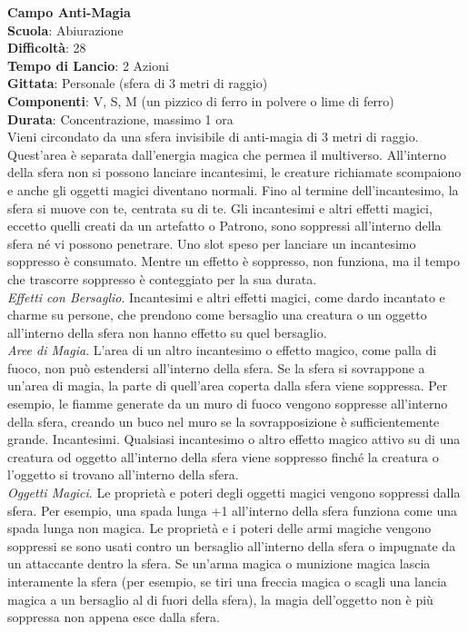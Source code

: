 \begin{multicols}{2}
\medskip\textbf{Campo Anti-Magia}\\
\textbf{Scuola}: Abiurazione\\
\textbf{Difficoltà}: 28\\
\textbf{Tempo di Lancio}: 2 Azioni\\
\textbf{Gittata}: Personale (sfera di 3 metri di raggio)\\
\textbf{Componenti}: V, S, M (un pizzico di ferro in polvere o lime di ferro)\\
\textbf{Durata}: Concentrazione, massimo 1 ora\\
Vieni circondato da una sfera invisibile di anti-magia di 3 metri di raggio. Quest'area è separata dall'energia magica che permea il multiverso. All'interno della sfera non si possono lanciare incantesimi, le creature richiamate scompaiono e anche gli oggetti magici diventano normali. Fino al termine dell'incantesimo, la sfera si muove con te, centrata su di te. Gli incantesimi e altri effetti magici, eccetto quelli creati da un artefatto o Patrono, sono soppressi all'interno della sfera né vi possono penetrare. Uno slot speso per lanciare un incantesimo soppresso è consumato. Mentre un effetto è soppresso, non funziona, ma il tempo che trascorre soppresso è conteggiato per la sua durata. 
\\\textit{Effetti con Bersaglio}. Incantesimi e altri effetti magici, come dardo incantato e charme su persone, che prendono come bersaglio una creatura o un oggetto all'interno della sfera non hanno effetto su quel bersaglio.
\\\textit{Aree di Magia}. L'area di un altro incantesimo o effetto magico, come palla di fuoco, non può estendersi all'interno della sfera. Se la sfera si sovrappone a un'area di magia, la parte di quell'area coperta dalla sfera viene soppressa. Per esempio, le fiamme generate da un muro di fuoco vengono soppresse all'interno della sfera, creando un buco nel muro se la sovrapposizione è sufficientemente grande. Incantesimi. Qualsiasi incantesimo o altro effetto magico attivo su di una creatura od oggetto all'interno della sfera viene soppresso finché la creatura o l'oggetto si trovano all'interno della sfera.\\
\textit{Oggetti Magici}. Le proprietà e poteri degli oggetti magici vengono soppressi dalla sfera. Per esempio, una spada lunga +1 all'interno della sfera funziona come una spada lunga non magica. Le proprietà e i poteri delle armi magiche vengono soppressi se sono usati contro un bersaglio all'interno della sfera o impugnate da un attaccante dentro la sfera. Se un'arma magica o munizione magica lascia interamente la sfera (per esempio, se tiri una freccia magica o scagli una lancia magica a un bersaglio al di fuori della sfera), la magia dell'oggetto non è più soppressa non appena esce dalla sfera.

\end{multicols}
